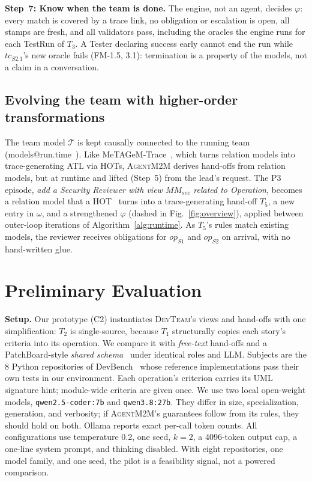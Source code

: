 \documentclass[10pt,conference]{IEEEtran}
\theoremstyle{definition}
\newcommand{\tool}{\textsc{AgentM2M}}
\newcommand{\devteam}{\textsc{DevTeam}}
\newcommand{\MM}{\mathit{MM}}
\newcommand{\team}{\mathcal{T}}
\newcommand{\cls}[1]{\textsf{#1}}
\begin{document}
\smallskip\noindent\textbf{Step~7: Know when the team is done.} The engine,
not an agent, decides $\varphi$: every match is covered by a trace link, no
obligation or escalation is open, all stamps are fresh, and all validators
pass, including the oracles the engine runs for each \cls{TestRun} of
$T_3$. A Tester declaring success early cannot end the run while
$\mathit{tc}_{S2.1}$'s new oracle fails (FM-1.5, 3.1): termination is a
property of the models, not a claim in a conversation.

\subsection{Evolving the team with higher-order transformations}
\label{subsec:hot}

The team model $\team$ is kept causally connected to the running team
(models@run.time~\cite{blair2009runtime}). Like
MeTAGeM-Trace~\cite{vara2014metagem}, which turns relation models into
trace-generating ATL via HOTs, \tool{} derives hand-offs from relation
models, but at runtime and lifted (Step~5) from the lead's request. The P3
episode,
\emph{add a Security Reviewer with view $\MM_{\mathit{sec}}$ related to
\cls{Operation}}, becomes a relation model that a HOT~\cite{tisi2009hot}
turns into a trace-generating hand-off $T_5$, a new entry in $\omega$, and
a strengthened $\varphi$ (dashed in Fig.~\ref{fig:overview}), applied
between outer-loop iterations of Algorithm~\ref{alg:runtime}. As $T_5$'s
rules match existing models, the reviewer receives obligations for
$\mathit{op}_{S1}$ and $\mathit{op}_{S2}$ on arrival, with no hand-written
glue.

\section{Preliminary Evaluation}\label{sec:eval}

\noindent\textbf{Setup.} Our prototype (C2) instantiates \devteam{}'s views
and hand-offs with one simplification: $T_2$ is single-source, because
$T_1$ structurally copies each story's criteria into its operation. We compare it with \emph{free-text} hand-offs
and a PatchBoard-style \emph{shared schema}~\cite{zhang2026patchboard}
under identical roles and LLM. Subjects are the 8 Python repositories of
DevBench~\cite{li2024devbench} whose reference implementations pass their
own tests in our environment. Each operation's criterion carries its UML
signature hint; module-wide criteria are given once. We use two local
open-weight models, \texttt{qwen2.5-coder:7b} and \texttt{qwen3.8:27b}.
They differ in size, specialization, generation, and verbosity; if
\tool{}'s guarantees follow from its rules, they should hold on both.
Ollama reports exact per-call token counts. All configurations use
temperature 0.2, one seed, $k{=}2$, a 4096-token output cap, a one-line
system prompt, and thinking disabled. With eight repositories, one model family, and one seed, the pilot is a
feasibility signal, not a powered comparison.
\end{document}
